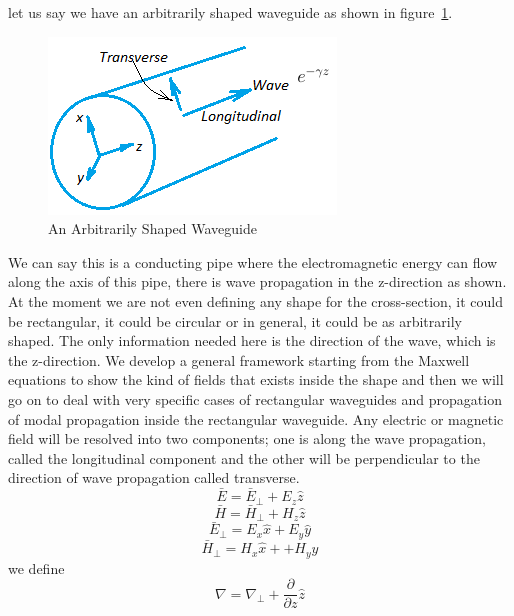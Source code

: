 let us say we have an arbitrarily shaped waveguide as shown in figure~\ref{fig:lect37}.
\begin{figure}[h]
\centering
\includegraphics[width=0.7\linewidth]{./graphics/lect37}
\caption{An Arbitrarily Shaped Waveguide}
\label{fig:lect37}
\end{figure}
We can say this is a conducting pipe where the electromagnetic energy can flow along the axis of this pipe, there is wave propagation in the z-direction as shown. At the moment we are not even defining any shape for the cross-section, it could be rectangular, it could be circular or in general, it could be as arbitrarily shaped. The only information needed here is the direction of the wave, which is the z-direction. We develop a general framework starting from the Maxwell equations to show the kind of fields that exists inside the shape and then we will go on to deal with very specific cases of rectangular waveguides and propagation of modal propagation inside the rectangular waveguide. Any electric or magnetic field will be resolved into two components; one is along the wave propagation, called the longitudinal component and the other will be perpendicular to the direction of wave propagation called transverse.
\begin{equation*}
\bar{E} = \bar{E}_\bot + E_z\hat{z}
\end{equation*}
\begin{equation*}
\bar{H} = \bar{H}_\bot + H_z\hat{z}
\end{equation*}
\begin{equation*}
\bar{E}_\bot = E_x\hat{x} + E_y\hat{y}
\end{equation*}
\begin{equation*}
\bar{H}_\bot = H_x\hat{x} + + H_y\hat{y}
\end{equation*}
we define
\begin{equation}
\nabla = \nabla_\bot + \frac{\partial}{\partial z}\hat{z}
\label{eqn:transversegrad}
\end{equation}
